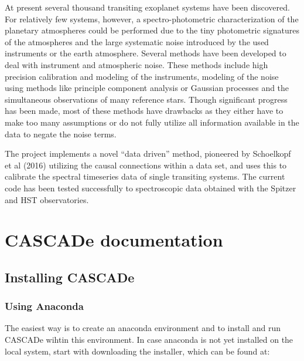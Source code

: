 \documentclass[a4paper,10pt,english]{sphinxmanual}
\begin{document}
        \clearpage
        \tableofcontents
        \listoffigures
        \listoftables
        \clearpage

        
\pagestyle{plain}
 
\pagestyle{normal}
\label{\detokenize{index::doc}}




At present several thousand transiting exoplanet systems have been discovered.
For relatively few systems, however, a spectro-photometric characterization of
the planetary atmospheres could be performed due to the tiny photometric signatures
of the atmospheres and the large systematic noise introduced by the used instruments
or the earth atmosphere. Several methods have been developed to deal with instrument
and atmospheric noise. These methods include high precision calibration and modeling
of the instruments, modeling of the noise using methods like principle component
analysis or Gaussian processes and the simultaneous observations of many reference
stars. Though significant progress has been made, most of these methods have drawbacks
as they either have to make too many assumptions or do not fully utilize all
information available in the data to negate the noise terms.

The  project implements a novel “data driven” method, pioneered by
Schoelkopf et al (2016) utilizing the causal connections within a data set,
and uses this to calibrate the spectral timeseries data of single transiting
systems. The current code has been tested successfully to spectroscopic data
obtained with the Spitzer and HST observatories.


\chapter{CASCADe documentation}
\label{\detokenize{index:cascade-documentation}}

\section{Installing CASCADe}
\label{\detokenize{install:installing-cascade}}\label{\detokenize{install::doc}}

\subsection{Using Anaconda}
\label{\detokenize{install:using-anaconda}}
The easiest way is to create an anaconda environment
and to install and run CASCADe wihtin this environment.
In case anaconda is not yet installed on the local system, start with
downloading the installer, which can be found at:
\begin{quote}

\end{quote}
\end{document}

